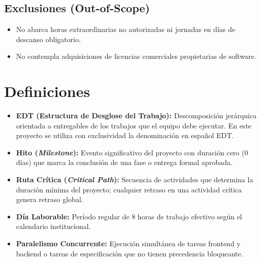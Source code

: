 \documentclass[12pt,a4paper]{article}
\begin{document}
\subsection{Exclusiones (Out-of-Scope)}
\begin{itemize}[leftmargin=1.5em, itemsep=1.5pt, topsep=1.5pt]
    \item No abarca horas extraordinarias no autorizadas ni jornadas en días de descanso obligatorio.
    \item No contempla adquisiciones de licencias comerciales propietarias de software.
\end{itemize}

\section{Definiciones}
\begin{itemize}[leftmargin=1.5em, itemsep=2pt, topsep=2pt]
    \item \textbf{EDT (Estructura de Desglose del Trabajo):} Descomposición jerárquica orientada a entregables de los trabajos que el equipo debe ejecutar. En este proyecto se utiliza con exclusividad la denominación en español EDT.
    \item \textbf{Hito (\textit{Milestone}):} Evento significativo del proyecto con duración cero (0 días) que marca la conclusión de una fase o entrega formal aprobada.
    \item \textbf{Ruta Crítica (\textit{Critical Path}):} Secuencia de actividades que determina la duración mínima del proyecto; cualquier retraso en una actividad crítica genera retraso global.
    \item \textbf{Día Laborable:} Período regular de 8 horas de trabajo efectivo según el calendario institucional.
    \item \textbf{Paralelismo Concurrente:} Ejecución simultánea de tareas frontend y backend o tareas de especificación que no tienen precedencia bloqueante.
\end{itemize}
\end{document}
